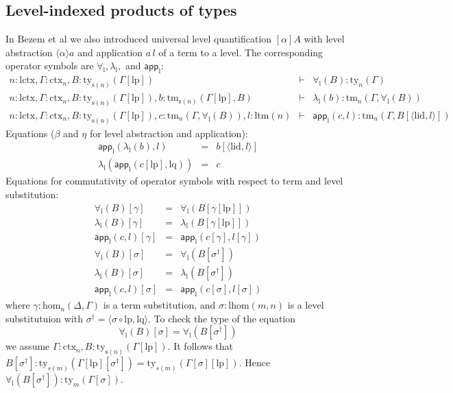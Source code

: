 \documentclass[11pt,a4paper]{article}
\theoremstyle{plain}
\theoremstyle{definition}
\newcommand{\app}[2]{{#1\,#2}} %
\def\lhom{\mathrm{lhom}}
\def\sub{\mathrm{hom}}
\def\lctx{\mathrm{lctx}}
\def\ltm{\mathrm{ltm}}
\def\lp{\mathrm{lp}}
\def\lq{\mathrm{lq}}
\def\s{\mathrm{s}}
\def\lid{\mathrm{lid}}
\newcommand{\ctx}{\mathrm{ctx}}
\newcommand{\ty}{\mathrm{ty}}
\newcommand{\tm}{\mathrm{tm}}
\newcommand{\tuple}[1]{\langle #1 \rangle}
\def\app{\mathsf{app}}
\begin{document}
\subsection{Level-indexed products of types}
\def\l{\mathrm{l}}
In Bezem et al \cite{BezemCDE22} we also introduced
universal level quantification $[\alpha]A$ with level abstraction $\tuple{\alpha}a$ and application $a\,l$ of a term to a level. The corresponding operator symbols are $\forall_\l, \lambda_\l,$ and $\app_\l$:
\begin{eqnarray*}
n : \lctx, \Gamma : \ctx_n, B : \ty_{\s(n)}(\Gamma[\lp])&\vdash& \forall_\l(B) : \ty_n(\Gamma)\\
n : \lctx, \Gamma : \ctx_n, B : \ty_{\s(n)}(\Gamma[\lp]), b : \tm_{\s(n)}(\Gamma[\lp], B) &\vdash& \lambda_\l(b) : \tm_n(\Gamma,\forall_\l(B))\\
n : \lctx, \Gamma : \ctx_n, B : \ty_{\s(n)}(\Gamma[\lp]), c :  \tm_n(\Gamma,\forall_\l(B)), l : \ltm(n) &\vdash& \app_\l(c,l) : \tm_n(\Gamma, B[\tuple{\lid,l}])
\end{eqnarray*}
Equations ($\beta$ and $\eta$ for level abstraction and application):
 \begin{eqnarray*}
 \app_\l(\lambda_\l(b),l) &=& b[\tuple{\lid,l}]\\
 \lambda_\l(\app_\l(c[\lp],\lq)) &=& c
 \end{eqnarray*}
 Equations for commutativity of operator symbols with respect to term and level substitution:
 \begin{eqnarray*}
 \forall_\l(B)[ \gamma ] &=& \forall_\l(B[ \gamma[\lp]])\\
 \lambda_\l(B)[ \gamma ] &=& \lambda_\l(B[ \gamma[\lp]])\\
 \app_\l(c,l)[ \gamma ] &=& \app_\l(c[ \gamma ] ,l[ \gamma ] )\\
 \forall_\l(B)[ \sigma ] &=& \forall_\l(B[ \sigma^{\dagger}])\\
 \lambda_\l(B)[ \sigma ] &=& \lambda_\l(B[ \sigma^{\dagger}])\\
\app_\l(c,l)[ \sigma ] &=& \app_\l(c[ \sigma ] ,l[ \sigma ] )
\end{eqnarray*}
where $\gamma : \sub_n(\Delta,\Gamma)$ is a term substitution, and $\sigma : \lhom(m,n)$ is a level substitutuion with $\sigma^\dagger = \tuple{\sigma \circ \lp, \lq}$.
To check the type of the equation
$$ \forall_\l(B)[ \sigma ] = \forall_\l(B[ \sigma^{\dagger}])$$ we assume $\Gamma : \ctx_n, B : \ty_{\s(n)}(\Gamma[\lp])$. It follows that $B[\sigma^\dagger] : \ty_{s(m)}(\Gamma[\lp][\sigma^\dagger]) = \ty_{s(m)}(\Gamma[\sigma][\lp])$. Hence
$\forall_\l(B[ \sigma^{\dagger}]) : \ty_m(\Gamma[\sigma])$.
\end{document}
